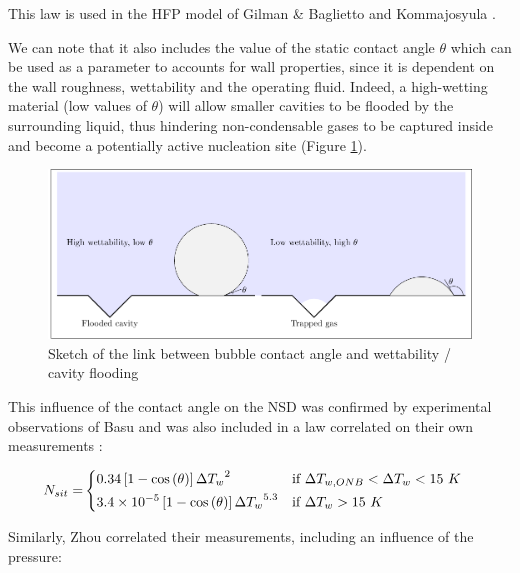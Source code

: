 \begin{note*}{}
This law is used in the HFP model of Gilman \& Baglietto \cite{gilman_self-consistent_2017} and Kommajosyula \cite{kommajosyula_development_2020}.
\end{note*}

We can note that it also includes the value of the static contact angle $\theta$ which can be used as a parameter to accounts for wall properties, since it is dependent on the wall roughness, wettability and the operating fluid.  Indeed, a high-wetting material (low values of $\theta$) will allow smaller cavities to be flooded by the surrounding liquid, thus hindering non-condensable gases to be captured inside and become a potentially active nucleation site (Figure \ref{fig:nsd_theta_wet}).

\begin{figure}[h!]
\centering
\includegraphics[scale=0.8]{img/NSD/wettability.pdf}
\caption{Sketch of the link between bubble contact angle and wettability / cavity flooding}
\label{fig:nsd_theta_wet}
\end{figure}

This influence of the contact angle on the NSD was confirmed by experimental observations of Basu \etal \cite{basu_wall_2005} and was also included in a law correlated on their own measurements :

\begin{align}
N_{sit}=&
\begin{dcases}
0.34\left[ 1-\mathrm{cos}\left( \theta \right) \right] {\Delta T_{w}}^{2} & \text{if } \Delta T_{w,ONB}<\Delta T_{w} < 15\ K\\
3.4\times 10^{-5}\left[ 1-\mathrm{cos}\left( \theta \right) \right] {\Delta T_{w}}^{5.3} & \text{if } \Delta T_{w} > 15\ K
\end{dcases}
\label{eq:nsit_basu}
\end{align}

\npar

Similarly, Zhou \etal \cite{zhou_experimental_2020} correlated their measurements, including an influence of the pressure:

